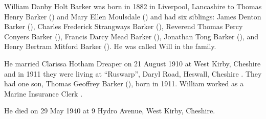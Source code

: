 
William Danby Holt Barker was born in 1882 in Liverpool, Lancashire to Thomas Henry Barker () and Mary Ellen Moulsdale () \cite{WDHBarkerBirth} and had six siblings: James Denton Barker (),  Charles Frederick Strangways Barker (), Reverend Thomas Percy Conyers Barker (), Francis Darcy Mead Barker (), Jonathan Tong Barker (), and Henry Bertram Mitford Barker (). He was called Will in the family.

He married Clarissa Hotham Dreaper {} on 21 August 1910 at West Kirby, Cheshire\cite{CheshireParishRegisters} and in 1911 they were living at ``Ruswarp'', Daryl Road, Heswall, Cheshire \cite{WDHBarker1911}.  They had one son, Thomas Geoffrey Barker (), born in 1911. William worked as a Marine Insurance Clerk \cite{WDHBarker1911}.

He died on 29 May 1940 at 9 Hydro Avenue, West Kirby, Cheshire.
